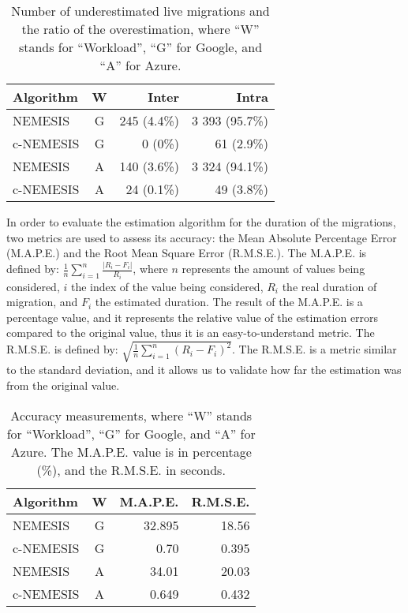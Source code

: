 \begin{table}[h]
\caption{Number of underestimated live migrations and the ratio of the overestimation, where ``W'' stands for ``Workload'', ``G'' for Google, and ``A'' for Azure.}\label{tab:migs_under} \centering
\begin{tabular}{|l|c|r|r|}
  \hline
  \textbf{Algorithm} & \textbf{W}  & \textbf{Inter} & \textbf{Intra}   \\
  \hline
  NEMESIS  & G & 245 (4.4\%)   & 3 393 (95.7\%) \\
  \hline
  c-NEMESIS & G & 0 (0\%)  & 61 (2.9\%) \\
  \hline
  NEMESIS & A & 140 (3.6\%)   &  3 324 (94.1\%)   \\
  \hline
  c-NEMESIS & A & 24 (0.1\%)   & 49 (3.8\%) \\
  \hline  
\end{tabular}
\end{table}


In order to evaluate the estimation algorithm for the duration of the migrations, two metrics are used to assess its accuracy: the Mean Absolute Percentage Error (M.A.P.E.) and the Root Mean Square Error (R.M.S.E.). The M.A.P.E. is defined by: $ \frac{1}{n}\sum_{i=1}^{n}  \frac{| R_{i} - F_{i}|}{R_{i}}$, where $n$ represents the amount of values being considered, $i$ the index of the value being considered, $R_{i}$ the real duration of migration, and $F_{i}$ the estimated duration. The result of the M.A.P.E. is a percentage value, and it represents the relative value of the estimation errors compared to the original value, thus it is an easy-to-understand metric. The R.M.S.E. is defined by: $\sqrt{ \frac{1}{n}\sum_{i=1}^{n}  (R_{i} - F_{i})^2}$. The R.M.S.E. is a metric similar to the standard deviation, and it allows us to validate how far the estimation was from the original value.

\begin{table}[h]
  \caption{Accuracy measurements, where ``W'' stands for ``Workload'', ``G'' for Google, and ``A'' for Azure. The M.A.P.E. value is in percentage (\%), and the R.M.S.E. in seconds. }\label{tab:accuracy} \centering
\begin{tabular}{|l|c|r|r|}
  \hline
  \textbf{Algorithm} & \textbf{W}  & \textbf{M.A.P.E.} & \textbf{R.M.S.E.}\\
  \hline
  NEMESIS & G & 32.895 & 18.56 \\
  \hline
  c-NEMESIS  & G & 0.70  & 0.395 \\
  \hline
  NEMESIS & A & 34.01 & 20.03 \\
  \hline
  c-NEMESIS  & A & 0.649  & 0.432 \\
  \hline
\end{tabular}
\end{table}



